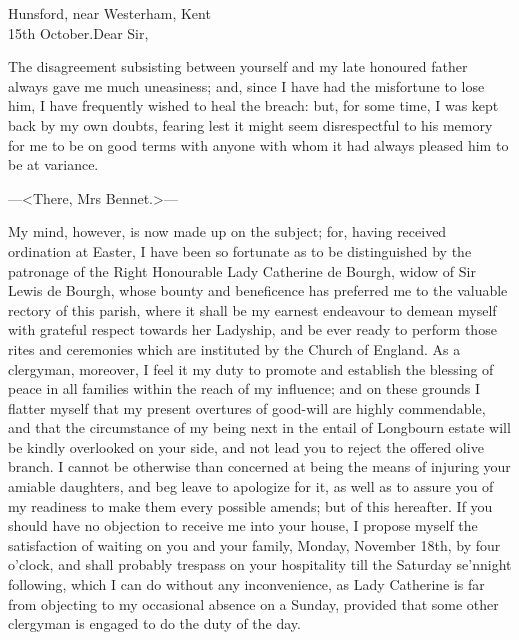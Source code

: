 \begin{mail}{Hunsford, near Westerham, Kent\\ 15th October.}{Dear Sir,}

The disagreement subsisting between yourself and my late honoured father always gave me much uneasiness; and, since I have had the misfortune to lose him, I have frequently wished to heal the breach: but, for some time, I was kept back by my own doubts, fearing lest it might seem disrespectful to his memory for me to be on good terms with anyone with whom it had always pleased him to be at variance.
\pausemail

—<There, Mrs Bennet.>—

\resumemail
My mind, however, is now made up on the subject; for, having received ordination at Easter, I have been so fortunate as to be distinguished by the patronage of the Right Honourable Lady Catherine de Bourgh, widow of Sir Lewis de Bourgh, whose bounty and beneficence has preferred me to the valuable rectory of this parish, where it shall be my earnest endeavour to demean myself with grateful respect towards her Ladyship, and be ever ready to perform those rites and ceremonies which are instituted by the Church of England. As a clergyman, moreover, I feel it my duty to promote and establish the blessing of peace in all families within the reach of my influence; and on these grounds I flatter myself that my present overtures of good-will are highly commendable, and that the circumstance of my being next in the entail of Longbourn estate will be kindly overlooked on your side, and not lead you to reject the offered olive branch. I cannot be otherwise than concerned at being the means of injuring your amiable daughters, and beg leave to apologize for it, as well as to assure you of my readiness to make them every possible amends; but of this hereafter. If you should have no objection to receive me into your house, I propose myself the satisfaction of waiting on you and your family, Monday, November 18th, by four o'clock, and shall probably trespass on your hospitality till the Saturday se'nnight following, which I can do without any inconvenience, as Lady Catherine is far from objecting to my occasional absence on a Sunday, provided that some other clergyman is engaged to do the duty of the day.

\end{mail}


